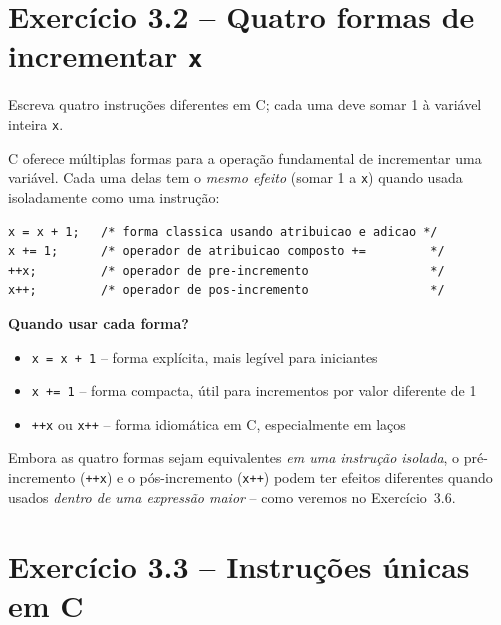 \documentclass[12pt,a4paper]{article}
\begin{document}
\newpage

\section{Exercício 3.2 -- Quatro formas de incrementar \texttt{x}}

\begin{enunciadoBox}[Enunciado 3.2]
Escreva quatro instruções diferentes em C; cada uma deve somar 1 à variável inteira \texttt{x}.
\end{enunciadoBox}

\begin{respostabox}
C oferece múltiplas formas para a operação fundamental de incrementar uma variável.
Cada uma delas tem o \textit{mesmo efeito} (somar 1 a \texttt{x}) quando usada
isoladamente como uma instrução:

\begin{lstlisting}
x = x + 1;   /* forma classica usando atribuicao e adicao */
x += 1;      /* operador de atribuicao composto +=         */
++x;         /* operador de pre-incremento                 */
x++;         /* operador de pos-incremento                 */
\end{lstlisting}

\textbf{Quando usar cada forma?}
\begin{itemize}
  \item \texttt{x = x + 1} -- forma explícita, mais legível para iniciantes
  \item \texttt{x += 1} -- forma compacta, útil para incrementos por valor diferente de 1
  \item \texttt{++x} ou \texttt{x++} -- forma idiomática em C, especialmente em laços
\end{itemize}

\begin{boaprática}
  Embora as quatro formas sejam equivalentes \textit{em uma instrução isolada},
  o pré-incremento (\texttt{++x}) e o pós-incremento (\texttt{x++}) podem ter
  efeitos diferentes quando usados \textit{dentro de uma expressão maior} -- como
  veremos no Exercício~3.6.
\end{boaprática}
\end{respostabox}

\newpage

\section{Exercício 3.3 -- Instruções únicas em C}
\end{document}
